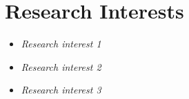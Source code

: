\section{Research Interests}
\begin{itemize}
 \item \textit{Research interest 1}
 \item \textit{Research interest 2}
 \item \textit{Research interest 3}
\end{itemize}
